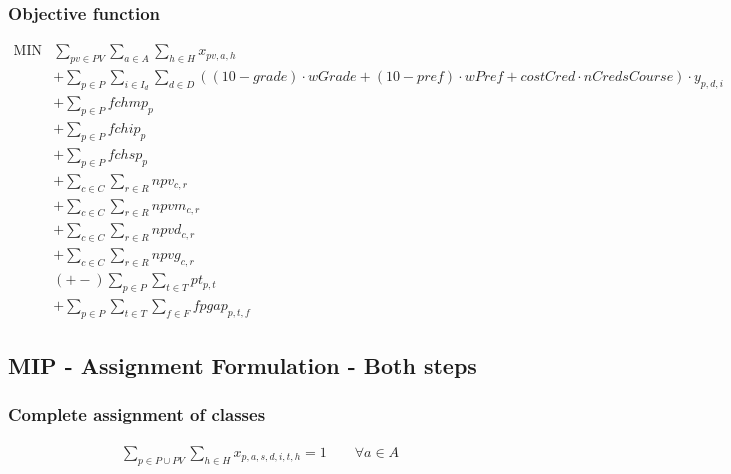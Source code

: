 \subsubsection{Objective function}

$$
\begin{array}{rl}
   \mbox{MIN} &
       \sum\limits_{pv \in PV} \sum\limits_{a \in A} \sum\limits_{h \in H} x_{pv,a,h}
      \\
      &
       + \sum\limits_{p \in P} \sum\limits_{i \in I_{d}} \sum\limits_{d \in D}
       ( ( 10 - grade ) \cdot wGrade + ( 10 - pref ) \cdot wPref + costCred \cdot nCredsCourse ) \cdot y_{p,d,i}
      \\
      &
       + \sum\limits_{p \in P} fchmp_{p}
      \\                 
      &
       + \sum\limits_{p \in P} fchip_{p}
      \\
      &
       + \sum\limits_{p \in P} fchsp_{p}
      \\
      &
       + \sum\limits_{c \in C} \sum\limits_{r \in R} npv_{c,r}
      \\   
      &
       + \sum\limits_{c \in C} \sum\limits_{r \in R} npvm_{c,r}
      \\   
      &
       + \sum\limits_{c \in C} \sum\limits_{r \in R} npvd_{c,r}
      \\               
      &
       + \sum\limits_{c \in C} \sum\limits_{r \in R} npvg_{c,r}
      \\                     
      &
       (+-) \sum\limits_{p \in P} \sum\limits_{t \in T} pt_{p,t}
      \\   
      &
      + \sum\limits_{p \in P} \sum\limits_{t \in T} \sum\limits_{f \in F} fpgap_{p,t,f}
\end{array}
$$



\subsection{MIP - Assignment Formulation - Both steps}

\subsubsection{Complete assignment of classes}
\begin{eqnarray}
\sum\limits_{p \in P \cup PV}\sum\limits_{h \in H} x_{p,a,s,d,i,t,h} =  1 \nonumber \qquad 
\forall a \in A 
\end{eqnarray}

